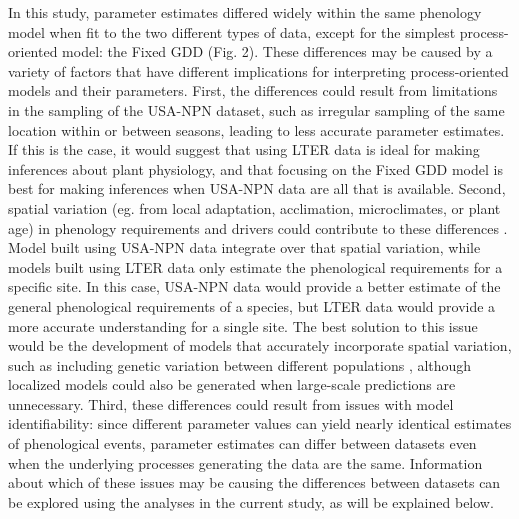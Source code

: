 \documentclass[fleqn,12pt,lineno]{article}
\begin{document}
In this study, parameter estimates differed widely within the same phenology model when fit to the two different types of data, except for the simplest process-oriented model: the Fixed GDD (Fig. 2). These differences may be caused by a variety of factors that have different implications for interpreting process-oriented models and their parameters. First, the differences could result from limitations in the sampling of the USA-NPN dataset, such as irregular sampling of the same location within or between seasons, leading to less accurate parameter estimates. If this is the case, it would suggest that using LTER data is ideal for making inferences about plant physiology, and that focusing on the Fixed GDD model is best for making inferences when USA-NPN data are all that is available. Second, spatial variation (eg. from local adaptation, acclimation, microclimates, or plant age)  in phenology requirements and drivers could contribute to these differences \citep{diez2012, zhang2017}. Model built using USA-NPN data integrate over that spatial variation, while models built using LTER data only estimate the phenological requirements for a specific site. In this case, USA-NPN data would provide a better estimate of the general phenological requirements of a species, but LTER data would provide a more accurate understanding for a single site. The best solution to this issue would be the development of models that accurately incorporate spatial variation, such as including genetic variation between different populations \citep{chuine2017}, although localized models could also be generated when large-scale predictions are unnecessary. Third, these differences could result from issues with model identifiability: since different parameter values can yield nearly identical estimates of phenological events, parameter estimates can differ between datasets even when the underlying processes generating the data are the same. Information about which of these issues may be causing the differences between datasets can be explored using the analyses in the current study, as will be explained below.
\end{document}
